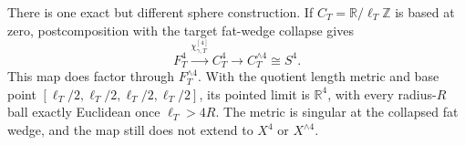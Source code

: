\begin{theorem}
There is one exact but different sphere construction.  If
\(C_T=\mathbb R/\ell_T\mathbb Z\) is based at zero, postcomposition with
the target fat-wedge collapse gives
\begin{equation}
 F_T^4\xrightarrow{\chi_{\gamma,T}^{[4]}}C_T^4
 \longrightarrow C_T^{\wedge4}\cong S^4.
 \label{wb:cusp-spec-target-smash-map}
\end{equation}
This map does factor through \(F_T^{\wedge4}\).  With the quotient length
metric and base point
\([\ell_T/2,\ell_T/2,\ell_T/2,\ell_T/2]\), its pointed limit is
\(\mathbb R^4\), with every radius-\(R\) ball exactly Euclidean once
\(\ell_T>4R\).  The metric is singular at the collapsed fat wedge, and
the map still does not extend to \(X^4\) or \(X^{\wedge4}\).
\end{theorem}



